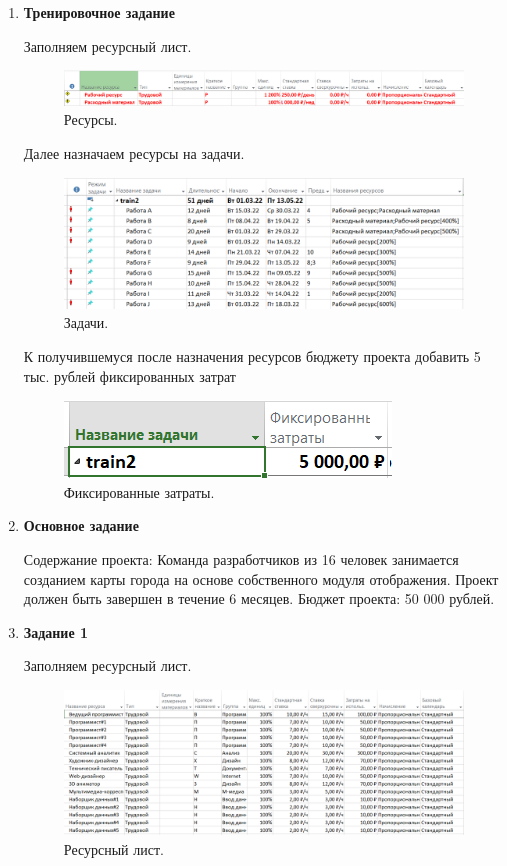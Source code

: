 \documentclass[a4paper,14pt]{extreport} %
\begin{document}
\begin{enumerate}
\item \textbf{Тренировочное задание}

Заполняем ресурсный лист.

\begin{figure}[H]
  \centering
  \caption{Ресурсы. }
  \includegraphics[scale=0.6]{dop}
\end{figure}

Далее назначаем ресурсы на задачи.

\begin{figure}[H]
  \centering
  \caption{Задачи. }
  \includegraphics[scale=0.8]{dop1}
\end{figure}

К получившемуся после назначения ресурсов бюджету проекта добавить 5 тыс.
рублей фиксированных затрат

\begin{figure}[H]
	\centering
	\caption{Фиксированные затраты. }
	\includegraphics[]{dop2}
\end{figure}

\item \textbf{Основное задание}

Содержание проекта: Команда разработчиков из 16 человек занимается созданием карты города на основе собственного модуля отображения. Проект должен быть завершен в течение 6 месяцев. Бюджет проекта: 50 000 рублей.

\item \textbf{Задание 1}

Заполняем ресурсный лист.

\begin{figure}[H]
  \centering
  \caption{Ресурсный лист. }
  \includegraphics[scale=0.6]{list}
\end{figure}


\end{enumerate}
\end{document}
